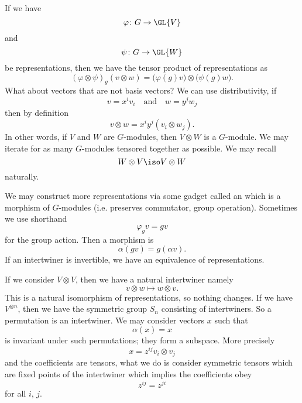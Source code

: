 If we have
\begin{equation}
\varphi\colon G\to\GL{V}
\end{equation}
and
\begin{equation}
\psi\colon G\to\GL{W}
\end{equation}
be representations, then we have the tensor product of
representations as
\begin{equation}
(\varphi\otimes\psi)_{g}(v\otimes w)=\big(\varphi(g)v\big)\otimes\big(\psi(g)w\big).
\end{equation}
What about vectors that are not basis vectors? We can use
distributivity, if
\begin{equation}
v=x^{i}v_{i}\quad\mbox{and}\quad w=y^{j}w_{j}
\end{equation}
then by definition
\begin{equation}
v\otimes w=x^{i}y^{j}(v_{i}\otimes w_{j}).
\end{equation}
In other words, if $V$ and $W$ are $G$-modules, then $V\otimes W$
is a $G$-module. We may iterate for as many $G$-modules tensored
together as possible. We may recall 
\begin{equation}
W\otimes V\iso V\otimes W
\end{equation}
naturally.

We may construct more representations via some gadget called an
 which is a morphism of $G$-modules
(i.e. preserves commutator, group operation). Sometimes we use
shorthand
\begin{equation}
\varphi_{g}v = gv
\end{equation}
for the group action. Then a morphism is
\begin{equation}
\alpha(gv)=g(\alpha v).
\end{equation}
If an intertwiner is invertible, we have an equivalence of
representations. 

If we consider $V\otimes V$, then we have a natural intertwiner
namely
\begin{equation}
v\otimes w\mapsto w\otimes v.
\end{equation}
This is a natural isomorphism of representations, so nothing
changes. If we have $V^{\otimes n}$, then we have the symmetric
group $S_{n}$ consisting of intertwiners. So a permutation is an
intertwiner. We may consider vectors $x$ such that
\begin{equation}
\alpha(x)=x
\end{equation}
is invariant under such permutations; they form a subspace. More
precisely
\begin{equation}
x=z^{ij}v_{i}\otimes v_{j}
\end{equation}
and the coefficients are tensors, what we do is consider
symmetric tensors which are fixed points of the intertwiner which
implies the coefficients obey
\begin{equation}
z^{ij}=z^{ji}
\end{equation}
for all $i$, $j$.

